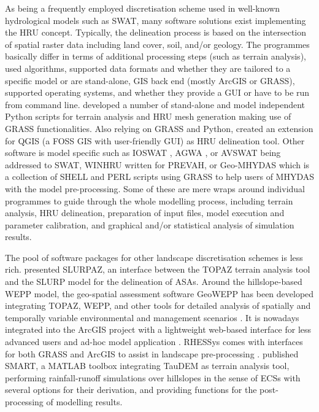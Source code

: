 As being a frequently employed discretisation scheme used in well-known hydrological models such as SWAT, many software solutions exist implementing the HRU concept.
Typically, the delineation process is based on the intersection of spatial raster data including land cover, soil, and/or geology.
The programmes basically differ in terms of additional processing steps (such as terrain analysis), used algorithms, supported data formats and whether they are tailored to a specific model or are stand-alone, GIS back end (mostly ArcGIS or GRASS), supported operating systems, and whether they provide a GUI or have to be run from command line.
\citet{Sanzana2013} developed a number of stand-alone and model independent Python scripts for terrain analysis and HRU mesh generation making use of GRASS functionalities.
Also relying on GRASS and Python, \citet{Schwartze2008} created an extension for QGIS (a FOSS GIS with user-friendly GUI) as HRU delineation tool.
Other software is model specific such as IOSWAT \citep{Haverkamp2005}, AGWA \citep{Miller2002, Miller2007}, or AVSWAT \citep{DiLuzio2004} being addressed to SWAT, WINHRU \citep{Viviroli2009} written for PREVAH, or Geo-MHYDAS \citep{Lagacherie2010} which is a collection of SHELL and PERL scripts using GRASS to help users of MHYDAS with the model pre-processing.
Some of these are mere wraps around individual programmes to guide through the whole modelling process, including terrain analysis, HRU delineation, preparation of input files, model execution and parameter calibration, and graphical and/or statistical analysis of simulation results.

The pool of software packages for other landscape discretisation schemes is less rich.
\citet{Lacroix2002} presented SLURPAZ, an interface between the TOPAZ terrain analysis tool and the SLURP model for the delineation of ASAs.
\DIFaddbegin {}\DIFaddend Around the hillslope-based WEPP model, the geo-spatial assessment software GeoWEPP has been developed integrating TOPAZ, WEPP, and other tools for detailed analysis of spatially and temporally variable environmental and management scenarios \citep{Renschler2003}.
It is nowadays integrated into the ArcGIS project with a lightweight web-based interface for less advanced users and ad-hoc model application \citep{Flanagan2013}.
RHESSys comes with interfaces for both GRASS and ArcGIS to assist in landscape pre-processing \citep{Band2000}.
\citet{Ajami2016} published SMART, a MATLAB toolbox integrating TauDEM as terrain analysis tool, performing rainfall-runoff simulations over hillslopes in the sense of ECSs with several options for their derivation, and providing functions for the post-processing of modelling results.

